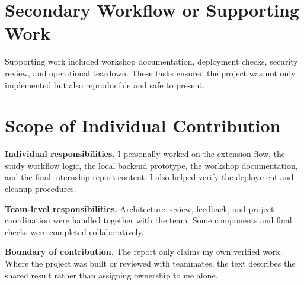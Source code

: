 \section{Secondary Workflow or Supporting Work}

Supporting work included workshop documentation, deployment checks, security
review, and operational teardown. These tasks ensured the project was not only
implemented but also reproducible and safe to present.

\section{Scope of Individual Contribution}

\textbf{Individual responsibilities.}
I personally worked on the extension flow, the study workflow logic, the local
backend prototype, the workshop documentation, and the final internship report
content. I also helped verify the deployment and cleanup procedures.

\textbf{Team-level responsibilities.}
Architecture review, feedback, and project coordination were handled together
with the team. Some components and final checks were completed collaboratively.

\textbf{Boundary of contribution.}
The report only claims my own verified work. Where the project was built or
reviewed with teammates, the text describes the shared result rather than
assigning ownership to me alone.
